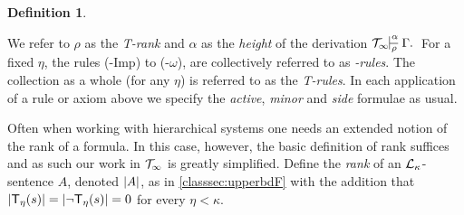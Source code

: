 \documentclass[UKenglish,cleveref,DIV=12]{scrartcl}
\let\forall\forallAlt
\theoremstyle{definition}
\newtheorem{definition}[lemma]{Definition}
\theoremstyle{definition}
\begin{document}
\begin{definition}
\end{definition}
We refer to $\rho$ as the {\em T-rank} and $\alpha$ as the {\em height} of the derivation $\Tinfty\prov\alpha{}$ For a fixed $\eta$, the rules (\textT\eta-Imp) to (\textT\eta-$\omega$), are collectively referred to as {\em \textT\eta-rules}. The collection as a whole (for any $\eta$) is referred to as the {\em T-rules}. In each application of a rule or axiom above we specify the {\em active}, {\em minor} and {\em side} formulae as usual.

Often when working with hierarchical systems one needs an extended notion of the
rank of a formula. In this case, however, the basic definition of rank suffices
and as such our work in $\mathcal{T}_\infty$ is greatly simplified. Define the {\em rank}
of an $\mathcal{L}_\kappa$-sentence $A$, denoted $\lvert{A}\rvert$, as in \cref{classsec:upperbdF} with the addition that $==0$ for every $\eta<\kappa$.
\end{document}
